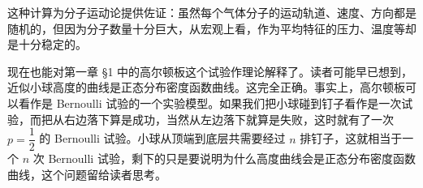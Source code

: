\documentclass[../../main.tex]{subfiles}
\begin{document}
这种计算为分子运动论提供佐证：虽然每个气体分子的运动轨道、速度、方向都是随机的，但因为分子数量十分巨大，从宏观上看，作为平均特征的压力、温度等却是十分稳定的。

现在也能对第一章 \S1 中的高尔顿板这个试验作理论解释了。读者可能早已想到，近似小球高度的曲线是正态分布密度函数曲线。这完全正确。事实上，高尔顿板可以看作是 Bernoulli 试验的一个实验模型。如果我们把小球碰到钉子看作是一次试验，而把从右边落下算是成功，当然从左边落下就算是失败，这时就有了一次 $p=\dfrac12$ 的 Bernoulli 试验。小球从顶端到底层共需要经过 $n$ 排钉子，这就相当于一个 $n$ 次 Bernoulli 试验，剩下的只是要说明为什么高度曲线会是正态分布密度函数曲线，这个问题留给读者思考。
\end{document}

